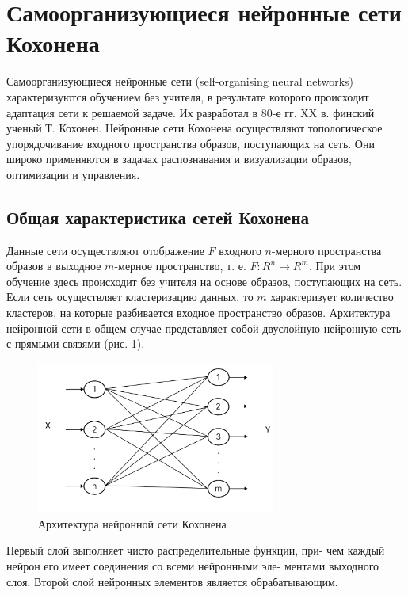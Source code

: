 \documentclass[bachelor, och, referat]{template}
\begin{document}
\section{Самоорганизующиеся нейронные сети Кохонена}

Самоорганизующиеся нейронные сети (self-organising neural networks)
характеризуются обучением без учителя, в результате которого происходит 
адаптация сети к решаемой задаче. Их разработал в 80-е гг. XX в.
финский ученый Т. Кохонен. Нейронные сети
Кохонена осуществляют топологическое упорядочивание входного
пространства образов, поступающих на сеть. Они широко применяются
в задачах распознавания и визуализации образов, оптимизации и
управления.

\subsection{Общая характеристика сетей Кохонена}

Данные сети осуществляют отображение $F$ входного $n$-мерного пространства 
образов в выходное $m$-мерное пространство, т. е. $F : R^n \rightarrow R^m$.
При этом обучение здесь происходит без учителя на основе образов,
поступающих на сеть. Если сеть осуществляет кластеризацию данных,
то $m$ характеризует количество кластеров, на которые разбивается входное 
пространство образов. Архитектура нейронной сети в общем случае
представляет собой двуслойную нейронную сеть с прямыми связями (рис. \ref{nn1}).

\begin{figure}[H]
    \centering
    \includegraphics[width=0.7\textwidth]{pics/nn1.png}
    \caption{Архитектура нейронной сети Кохонена}
    \label{nn1}
\end{figure}

Первый слой выполняет чисто распределительные функции, при-
чем каждый нейрон его имеет соединения со всеми нейронными эле-
ментами выходного слоя. Второй слой нейронных элементов является
обрабатывающим.
\end{document}
